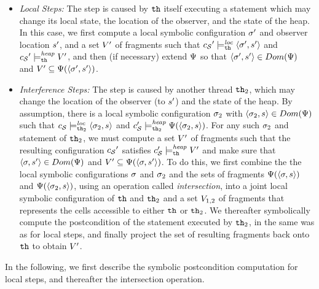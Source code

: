 \begin{itemize}
\item
  {\it Local Steps:} The step
  is caused by ${\tt th}$ itself executing a statement
  which may change its local state, the location of the observer,
  and the state of the heap.
  In this case, we first compute a local symbolic configuration $\sigma'$ and
  observer location $s'$, and a set $V'$ of fragments such that
  ${c_{\mathcal S}}' \models_{{\tt th}}^{\mathit{loc}} \left\langle\sigma',s'\right\rangle$ and
  ${c_{\mathcal S}}' \models_{{\tt th}}^{\mathit{heap}} V'$,
  and then (if necessary) extend $\Psi$ so that
  $\left\langle\sigma',s'\right\rangle \in Dom(\Psi)$ and
  $V' \subseteq \Psi(\left\langle\sigma',s'\right\rangle)$.
\item
  {\it Interference Steps:} The step is caused by another thread ${\tt th}_2$,
  which may change the location of the observer (to $s'$)
  and the state of the heap.
  By assumption, there is a local symbolic configuration $\sigma_2$
  with $\left\langle\sigma_2,s\right\rangle \in Dom(\Psi)$ such that
  $c_{\mathcal S} \models_{{\tt th}_2}^{\mathit{loc}} \left\langle\sigma_2,s\right\rangle$ and
  $c_{\mathcal S}' \models_{{\tt th}_2}^{\mathit{heap}} \Psi(\left\langle\sigma_2,s\right\rangle)$.
  For any such $\sigma_2$ and statement of ${\tt th}_2$,
  we must compute a set $V'$ of fragments such that
  the resulting configuration ${c_{\mathcal S}}'$ satisfies
  $c_{\mathcal S}' \models_{{\tt th}}^{\mathit{heap}} V'$ and 
  make sure that $\left\langle\sigma,s'\right\rangle \in Dom(\Psi)$ and
  $V' \subseteq \Psi(\left\langle\sigma,s'\right\rangle)$.
  To do this, we first combine the the local symbolic configurations
  $\sigma$ and $\sigma_2$ and the sets of fragments
  $\Psi(\left\langle\sigma,s\right\rangle)$ and
  $\Psi(\left\langle\sigma_2,s\right\rangle)$, using an
  operation called {\em intersection}, into
  a joint local symbolic configuration of ${\tt th}$ and ${\tt th}_2$ and
  a set $V_{1,2}$ of fragments that represents the cells accessible
  to either ${\tt th}$ or ${\tt th}_2$.
  We thereafter symbolically compute the postcondition of the statement
  executed by ${\tt th}_2$, in the same was as for local steps,
  and finally project the set of resulting fragments back onto ${\tt th}$
  to obtain $V'$.
\end{itemize}
In the following, we first describe the symbolic postcondition computation for
local steps, and thereafter the intersection operation.


